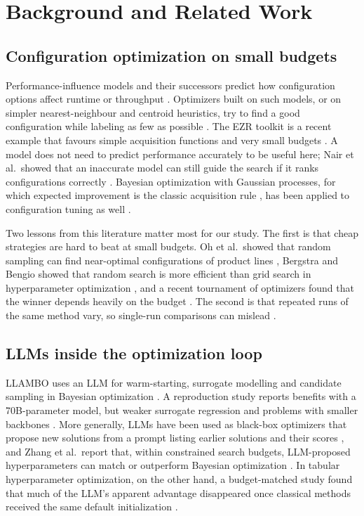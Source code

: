 \section{Background and Related Work}

\subsection{Configuration optimization on small budgets}

Performance-influence models and their successors predict how configuration options affect runtime or throughput \cite{siegmund2015influence,ha2019deepperf}. Optimizers built on such models, or on simpler nearest-neighbour and centroid heuristics, try to find a good configuration while labeling as few as possible \cite{nair2020flash,menzies2026ezr}. The EZR toolkit is a recent example that favours simple acquisition functions and very small budgets \cite{menzies2026ezr}. A model does not need to predict performance accurately to be useful here; Nair et al.\ showed that an inaccurate model can still guide the search if it ranks configurations correctly \cite{nair2017bad}. Bayesian optimization with Gaussian processes, for which expected improvement is the classic acquisition rule \cite{jones1998ego}, has been applied to configuration tuning as well \cite{jamshidi2016bo4co}.

Two lessons from this literature matter most for our study. The first is that cheap strategies are hard to beat at small budgets. Oh et al.\ showed that random sampling can find near-optimal configurations of product lines \cite{oh2017random}, Bergstra and Bengio showed that random search is more efficient than grid search in hyperparameter optimization \cite{bergstra2012random}, and a recent tournament of optimizers found that the winner depends heavily on the budget \cite{ganguly2026tournament}. The second is that repeated runs of the same method vary, so single-run comparisons can mislead \cite{rayegan2026instability}.

\subsection{LLMs inside the optimization loop}

LLAMBO uses an LLM for warm-starting, surrogate modelling and candidate sampling in Bayesian optimization \cite{liu2024llambo}. A reproduction study reports benefits with a 70B-parameter model, but weaker surrogate regression and problems with smaller backbones \cite{rychert2025reproduction}. More generally, LLMs have been used as black-box optimizers that propose new solutions from a prompt listing earlier solutions and their scores \cite{yang2024opro}, and Zhang et al.\ report that, within constrained search budgets, LLM-proposed hyperparameters can match or outperform Bayesian optimization \cite{zhang2023llmhpo}. In tabular hyperparameter optimization, on the other hand, a budget-matched study found that much of the LLM's apparent advantage disappeared once classical methods received the same default initialization \cite{rodrigues2026worth}.

